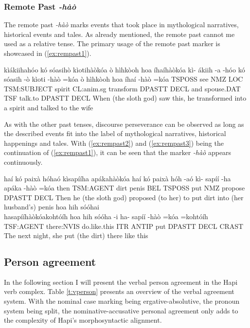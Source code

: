 \documentclass[a4paper, 12pt, oneside]{memoir}
\newcommand{\emh}[1]{\textit{#1}}
\begin{document}
\subsubsection{Remote Past \emh{-hàò}}\label{s:rempast}
The remote past \emh{-hàò} marks events that took place in mythological narratives, historical events and tales. As already mentioned, the remote past cannot me used as a relative tense. The primary usage of the remote past marker is showcased in (\ref{ex:rempast1}).
\begin{examples}
    \ex \label{ex:rempast1}
    \words kìákiihahóo kó sóasihò kìotihàòkóa ò hìhkòoh hoa íhaíhàòkóa
    \bits kì- ákiih -a -hóo kó sóasih -ò kìoti -hàò =kóa ò hìhkòoh hoa íhaí -hàò =kóa 
    \gloss TSPOSS see NMZ LOC TSM:SUBJECT spirit CL:anim.sg transform DPASTT DECL and spouse.DAT TSF talk.to DPASTT DECL  
    \tr When (the sloth god) saw this, he transformed into a spirit and talked to the wife
\end{examples}
As with the other past tenses, discourse perseverance can be observed as long as the described events fit into the label of mythological narratives, historical happenings and tales. With (\ref{ex:rempast2}) and (\ref{ex:rempast3}) being the continuation of (\ref{ex:rempast1}), it can be seen that the marker \emh{-hàò} appears continuously.
\begin{examples}
    \ex \label{ex:rempast2}
    \words haí kó paixà hóhaó kìsapííha apákahàòkóa
    \bits haí kó paixà hóh -aó kì- sapíí -ha apáka -hàò =kóa
    \gloss then TSM:AGENT dirt penis BEL TSPOSS put NMZ propose DPASTT DECL
    \tr Then he (the sloth god) proposed (to her) to put dirt into (her husband's) penis
    \ex \label{ex:rempast3}
    \words hoa hih sóóhai \\ hasapííhàòkóakohtóíh
    \bits hoa hih sóóha -i ha- sapíí -hàò =kóa =kohtóíh
    \gloss TSF:AGENT there:NVIS do.like.this ITR ANTIP put DPASTT DECL CRAST
    \tr The next night, she put (the dirt) there like this
\end{examples}
\subsection{Person agreement}\label{svperson}
In the following section I will present the verbal person agreement in the Hapi verb complex. Table \ref{t:vperson} presents an overview of the verbal agreement system. With the nominal case marking being ergative-absolutive, the pronoun system being split, the nominative-accusative personal agreement only adds to the complexity of Hapi's morphosyntactic alignment. 
\end{document}
